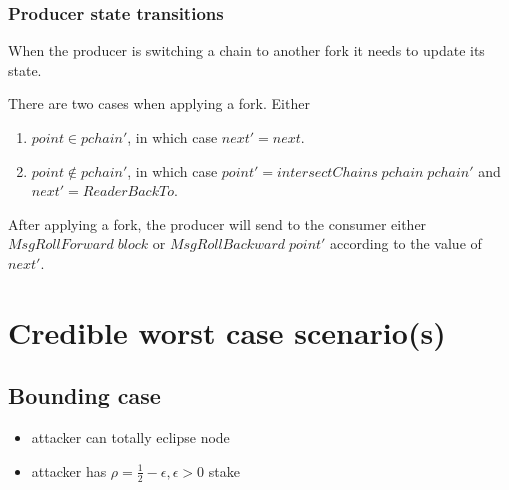 \documentclass{article}
\newcommand{\var}[1]{\mathit{#1}}
\newcommand{\type}[1]{\mathsf{#1}}
\theoremstyle{definition}{
  \newtheorem{lemma}{Lemma}[section] %
  \newtheorem{definition}[lemma]{Definition}
}
\theoremstyle{theorem}{
  \newtheorem{invariant}[lemma]{Invariant}
  \newtheorem{proofobligation}[lemma]{Proof Obligation}
}
\numberwithin{equation}{lemma}
\begin{document}
\subsubsection{Producer state transitions}
When the producer is switching a chain to another fork it needs to update its state.
\begin{center}
\end{center}
There are two cases when applying a fork.  Either 
\begin{enumerate}
    \item $\var{point}\in\var{pchain'}$, in which case $\var{next'}=\var{next}$.
    \item $\var{point}\notin\var{pchain'}$, in which case $\var{point'}=\var{intersectChains}\;\var{pchain}\;\var{pchain'}$ and $\var{next'}=\var{ReaderBackTo}$.
\end{enumerate}
After applying a fork, the producer will send to the consumer either
$\var{MsgRollForward}\;\var{block}$ or $\var{MsgRollBackward}\;\var{point'}$
according to the value of $\var{next'}$.




\appendix
\section{Credible worst case scenario(s)}
\subsection{Bounding case}
\begin{itemize}
\item attacker can totally eclipse node
\item attacker has  $\rho = \frac{1}{2} - \epsilon, \epsilon > 0$ stake
\end{itemize}
\end{document}
